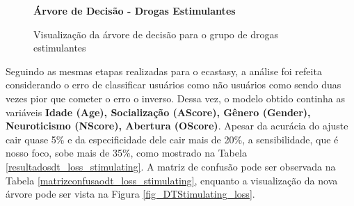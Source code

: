 \documentclass[
	article,			%
	11pt,				%
	oneside,			%
	a4paper,			%
	english,			%
	brazil,				%
	sumario=tradicional
	]{abntex2}
\begin{document}
\begin{figure}[H]
    \centering
    \textbf{Árvore de Decisão - Drogas Estimulantes}\par\medskip
    \caption{Visualização da árvore de decisão para o grupo de drogas estimulantes}
    \label{fig_DTStimulating}
\end{figure}

Seguindo as mesmas etapas realizadas para o ecastasy, a análise foi refeita considerando o erro de classificar usuários como não usuários como sendo duas vezes pior que cometer o erro o inverso. Dessa vez, o modelo obtido continha as variáveis \textbf{Idade (Age), Socialização (AScore), Gênero (Gender), Neuroticismo (NScore), Abertura (OScore)}. Apesar da acurácia do ajuste cair quase 5\% e da especificidade dele cair mais de 20\%, a sensibilidade, que é nosso foco, sobe mais de 35\%, como mostrado na Tabela \ref{resultadosdt_loss_stimulating}. A matriz de confusão pode ser observada na Tabela \ref{matrizconfusaodt_loss_stimulating}, enquanto a visualização da nova árvore pode ser vista na Figura \ref{fig_DTStimulating_loss}.
\end{document}
